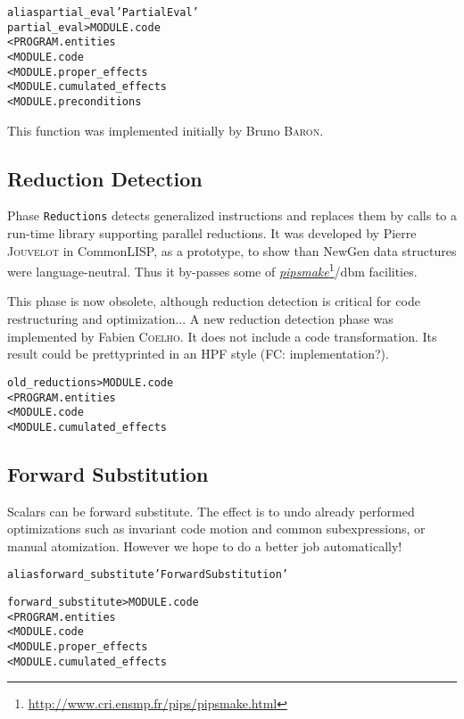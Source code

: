 \documentclass[a4paper]{report}
\newenvironment{PipsMake}{\begin{alltt}}{\end{alltt}}
\newcommand{\LINK}[2]{\href{#2}{#1}\footnote{\url{#2}}\xspace}
\newcommand{\PIPSMAKE}{\LINK{\emph{pipsmake}}{http://www.cri.ensmp.fr/pips/pipsmake.html}\xspace}
\begin{document}
\begin{PipsMake}
alias partial_eval 'Partial Eval'
partial_eval                    > MODULE.code
        < PROGRAM.entities
        < MODULE.code
        < MODULE.proper_effects
        < MODULE.cumulated_effects
        < MODULE.preconditions
\end{PipsMake}

This function was implemented initially by Bruno \textsc{Baron}.

\subsection{Reduction Detection}
\label{subsection-reduction-detection}

Phase \texttt{Reductions} detects generalized instructions and replaces
them by calls to a run-time library supporting parallel reductions. It was
developed by Pierre \textsc{Jouvelot} in CommonLISP, as a prototype, to show than
NewGen data structures were language-neutral. Thus it by-passes some of
\PIPSMAKE/dbm facilities.

This phase is now obsolete, although reduction detection is critical for
code restructuring and optimization... A new reduction detection phase was
implemented by Fabien \textsc{Coelho}. It does not include a code transformation.
Its result could be prettyprinted in an HPF style (FC: implementation?).

\begin{PipsMake}
old_reductions                      > MODULE.code
        < PROGRAM.entities
        < MODULE.code
        < MODULE.cumulated_effects
\end{PipsMake}

\subsection{Forward Substitution}

Scalars can be forward substitute. The effect is to undo already performed
optimizations such as invariant code motion and common subexpressions, or
manual atomization. However we hope to do a better job automatically!

\begin{PipsMake}
alias forward_substitute 'Forward Substitution'

forward_substitute      > MODULE.code
        < PROGRAM.entities
        < MODULE.code
        < MODULE.proper_effects
        < MODULE.cumulated_effects
\end{PipsMake}
\end{document}
